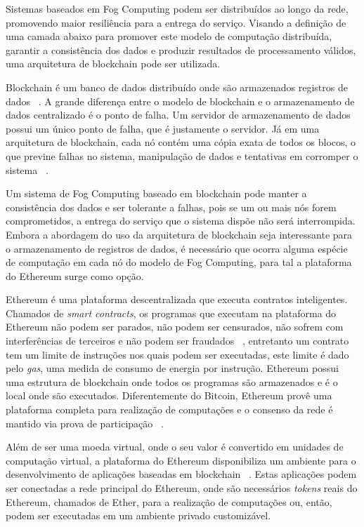 \documentclass[tcc-proposta]{texufpel}
\begin{document}
Sistemas baseados em Fog Computing podem ser distribuídos ao longo da rede, promovendo maior resiliência para a entrega do serviço. Visando a definição de uma camada abaixo para promover este modelo de computação distribuída, garantir a consistência dos dados e produzir resultados de processamento válidos, uma arquitetura de blockchain pode ser utilizada.
	
Blockchain é um banco de dados distribuído onde são armazenados registros de dados ~\cite{Juels2016}. A grande diferença entre o modelo de blockchain e o armazenamento de dados centralizado é o ponto de falha. Um servidor de armazenamento de dados possui um único ponto de falha, que é justamente o servidor. Já em uma arquitetura de blockchain, cada nó contém uma cópia exata de todos os blocos, o que previne falhas no sistema, manipulação de dados e tentativas em corromper o sistema ~\cite{Juels2016}.
	
Um sistema de Fog Computing baseado em blockchain pode manter a consistência dos dados e ser tolerante a falhas, pois se um ou mais nós forem comprometidos, a entrega do serviço que o sistema dispõe não será interrompida. Embora a abordagem do uso da arquitetura de blockchain seja interessante para o armazenamento de registros de dados, é necessário que ocorra alguma espécie de computação em cada nó do modelo de Fog Computing, para tal a plataforma do Ethereum surge como opção.
    
Ethereum é uma plataforma descentralizada que executa contratos inteligentes. Chamados de \textit{smart contracts}, os programas que executam na plataforma do Ethereum não podem ser parados, não podem ser censurados, não sofrem com interferências de terceiros e não podem ser fraudados ~\cite{wood2014ethereum}, entretanto um contrato tem um limite de instruções nos quais podem ser executadas, este limite é dado pelo \textit{gas}, uma medida de consumo de energia por instrução. Ethereum possui uma estrutura de blockchain onde todos os programas são armazenados e é o local onde são executados. Diferentemente do Bitcoin, Ethereum provê uma plataforma completa para realização de computações e o consenso da rede é mantido via prova de participação ~\cite{buterin2014next}. 
	
Além de ser uma moeda virtual, onde o seu valor é convertido em unidades de computação virtual, a plataforma do Ethereum disponibiliza um ambiente para o desenvolvimento de aplicações baseadas em blockchain ~\cite{wood2014ethereum}. Estas aplicações podem ser conectadas a rede principal do Ethereum, onde são necessários \textit{tokens} reais do Ethereum, chamados de Ether, para a realização de computações ou, então, podem ser executadas em um ambiente privado customizável.
	
\end{document}
